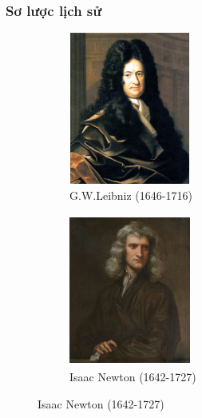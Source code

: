 \begin{frame}
\frametitle{Sơ lược lịch sử}    
     \begin{figure}[htbp]
    \centering
    \begin{subfigure}[t]{0.45\textwidth}
        \centering
        \includegraphics[width=4cm, height=5cm]{Slides/figure/Gottfried_Wilhelm_von_Leibniz.jpg}
        \caption{G.W.Leibniz (1646-1716)}
    \end{subfigure}
    \hfill
    \begin{subfigure}[t]{0.45\textwidth}
        \centering
        \includegraphics[width=4cm, height=5cm]{Slides/figure/Portrait_of_Sir_Isaac_Newton,_1689.jpg}
        \caption{Isaac Newton (1642-1727)}
    \end{subfigure}
\end{figure}
\end{frame}

